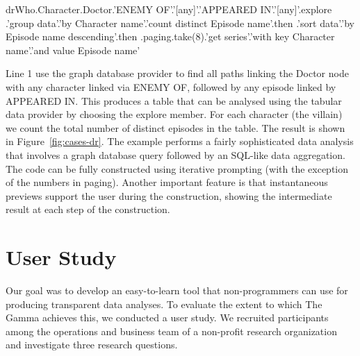 \documentclass[manuscript,review,anonymous]{acmart}
\newcommand{\ikvd}[1]{{\fontfamily{zi4}\selectfont\small #1}}
\begin{document}
\begin{thegamma}
drWho.Character.Doctor.'ENEMY OF'.'[any]'.'APPEARED IN'.'[any]'.explore
  .'group data'.'by Character name'.'count distinct Episode name'.then
  .'sort data'.'by Episode name descending'.then
  .paging.take(8).'get series'.'with key Character name'.'and value Episode name'
\end{thegamma}

\noindent
Line 1 use the graph database provider to find all paths linking the Doctor node with any
character linked via \ikvd{ENEMY OF}, followed by any episode linked by \ikvd{APPEARED IN}.
This produces a table that can be analysed using the tabular data provider by choosing the
\ikvd{explore} member. For each character (the villain) we count the total number of
distinct episodes in the table. The result is shown in Figure~\ref{fig:cases-dr}.
The example performs a fairly sophisticated data analysis that involves a graph database query
followed by an SQL-like data aggregation. The code can be fully constructed using iterative
prompting (with the exception of the numbers in paging). Another important feature is that
instantaneous previews support the user during the construction, showing the intermediate result
at each step of the construction.




\section{User Study}
\label{sec:study}

Our goal was to develop an easy-to-learn tool that non-programmers can use
for producing transparent data analyses. To evaluate the extent to which The Gamma achieves this,
we conducted a user study. We recruited participants among the operations and business team of a
non-profit research organization and investigate three research questions.
\end{document}
